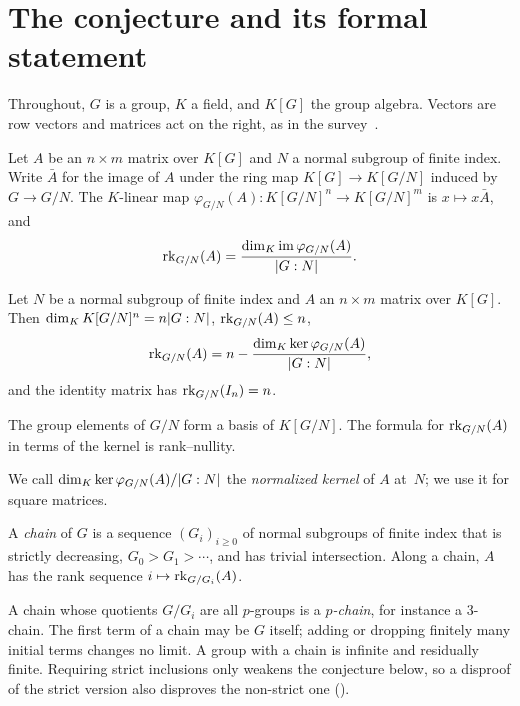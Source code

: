 \section{The conjecture and its formal statement}\label{sec:prelim}

Throughout, $G$ is a group, $K$ a field, and $K[G]$ the group algebra. Vectors are row vectors and matrices act on the
right, as in the survey~\cite[Section~1]{JaikinSurvey2019}.

\begin{definition}\label{def:rank}
Let $A$ be an $n\times m$ matrix over $K[G]$ and $N$ a normal subgroup of finite index. Write $\bar A$ for the image of
$A$ under the ring map $K[G]\to K[G/N]$ induced by $G\to G/N$. The $K$-linear map
$\varphi_{G/N}(A)\colon K[G/N]^n\to K[G/N]^m$ is $x\mapsto x\bar A$, and
\[
  \operatorname{rk}_{G/N}(A)=\frac{\dim_K\operatorname{im}\varphi_{G/N}(A)}{\lvert G:N \rvert}.
\]
\end{definition}

\begin{lemma}\label{lem:basic}
Let $N$ be a normal subgroup of finite index and $A$ an $n\times m$ matrix over $K[G]$. Then
$\dim_K K[G/N]^n=n\lvert G:N \rvert$, $\operatorname{rk}_{G/N}(A)\le n$,
\[
  \operatorname{rk}_{G/N}(A)=n-\frac{\dim_K\ker\varphi_{G/N}(A)}{\lvert G:N \rvert},
\]
and the identity matrix has $\operatorname{rk}_{G/N}(I_n)=n$.
\end{lemma}
\begin{outline}
The group elements of $G/N$ form a basis of $K[G/N]$. The formula for $\operatorname{rk}_{G/N}(A)$ in terms of the kernel is rank--nullity.
\end{outline}

We call $\dim_K\ker\varphi_{G/N}(A)/\lvert G:N \rvert$ the \emph{normalized kernel} of $A$ at~$N$; we use it for square
matrices.

\begin{definition}[Chains]\label{def:chain}
A \emph{chain} of $G$ is a sequence $(G_i)_{i\ge0}$ of normal subgroups of finite index that is strictly decreasing,
$G_0>G_1>\cdots$, and has trivial intersection. Along a chain, $A$ has the rank sequence $i\mapsto\operatorname{rk}_{G/G_i}(A)$.
\end{definition}

A chain whose quotients $G/G_i$ are all $p$-groups is a \emph{$p$-chain}, for instance a $3$-chain. The first term of a
chain may be $G$ itself; adding or dropping finitely many initial terms changes no limit. A group with a chain
is infinite and residually finite. Requiring strict inclusions only weakens the conjecture below, so a disproof of the
strict version also disproves the non-strict one ().

